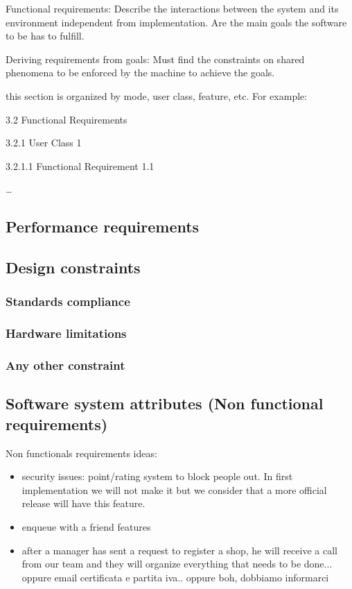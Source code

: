 Functional requirements: Describe the interactions between the system and its environment independent from implementation. Are the main goals the software to be has to fulfill.

Deriving requirements from goals: Must find the constraints on shared phenomena to be enforced by the machine to achieve the goals.

this section is organized by mode, user class, feature, etc. For example:

3.2 Functional Requirements

3.2.1 User Class 1

3.2.1.1 Functional Requirement 1.1

…

\subsection{Performance requirements}
\label{subsect:performancerequirements}

\subsection{Design constraints}
\label{subsect:designconstraints}

\subsubsection{Standards compliance}
\label{subsubsect:standardscompliance}

\subsubsection{Hardware limitations}
\label{subsubsect:hardwarelimitations}

\subsubsection{Any other constraint}
\label{subsubsect:anyotherconstraint}

\subsection{Software system attributes (Non functional requirements)}
\label{subsect:softwaresystemattributes}

Non functionals requirements ideas:
\begin{itemize}
    \item security issues: point/rating system to block people out. In first implementation we will not make it but we consider that a more official release will have this feature.
    \item enqueue with a friend features
    \item after a manager has sent a request to register a shop, he will receive a call from our team and they will organize everything that needs to be done... oppure email certificata e partita iva.. oppure boh, dobbiamo informarci
\end{itemize}

